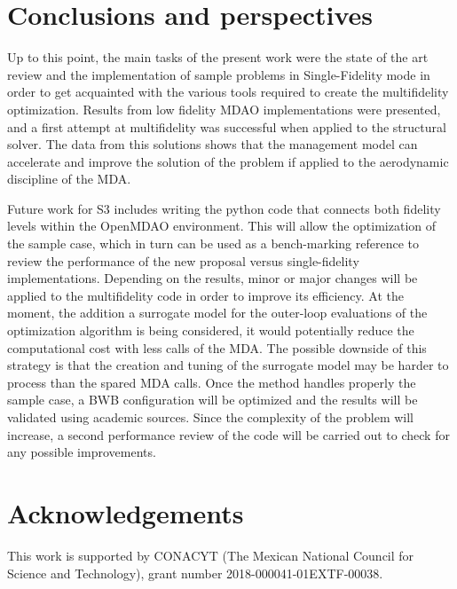 \section{Conclusions and perspectives}
\label{sec:conclusions}
Up to this point, the main tasks of the present work were the state of the art review and the implementation of sample problems in Single-Fidelity mode in order to get acquainted with the various tools required to create the multifidelity optimization. Results from low fidelity MDAO implementations were presented, and a first attempt at multifidelity was successful when applied to the structural solver. The data from this solutions shows that the management model can accelerate and improve the solution of the problem if applied to the aerodynamic discipline of the MDA. \par 
Future work for S3 includes writing the python code that connects both fidelity levels within the OpenMDAO environment. This will allow the optimization of the sample case, which in turn can be used as a bench-marking reference to review the performance of the new proposal versus single-fidelity implementations. Depending on the results, minor or major changes will be applied to the multifidelity code in order to improve its efficiency. At the moment, the addition a surrogate model for the outer-loop evaluations of the optimization algorithm is being considered, it would potentially reduce the computational cost with less calls of the MDA. The possible downside of this strategy is that the creation and tuning of the surrogate model may be harder to process than the spared MDA calls. 
Once the method handles properly the sample case, a BWB configuration will be optimized and the results will be validated using academic sources. Since the complexity of the problem will increase, a second performance review of the code will be carried out to check for any possible improvements.   
\section*{Acknowledgements}
This work is supported by CONACYT (The Mexican National Council for Science and Technology), grant number 2018-000041-01EXTF-00038.
